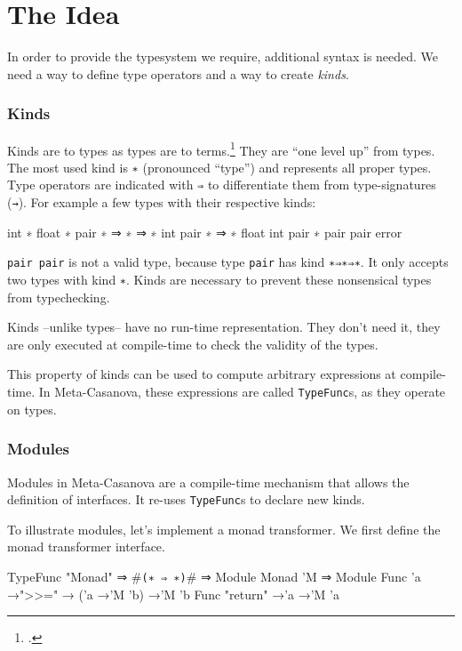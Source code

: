 \section{The Idea}
\begin{multicols}{2}\noindent
  In order to provide the typesystem we require, additional syntax is needed.
  We need a way to define type operators and a way to create \textit{kinds}.

  \subsubsection*{Kinds}
  Kinds are to types as types are to terms.\footcite[Chapter~30]{Pierce02}
  They are ``one level up'' from types.
  The most used kind is \texttt{∗} (pronounced ``type'') and represents all proper types.
  Type operators are indicated with \texttt{⇒} to differentiate them from type-signatures (\texttt{→}).
  For example a few types with their respective kinds:
  \begin{code}
  int             ∗
  float           ∗
  pair            ∗ ⇒ ∗ ⇒ ∗
  int pair        ∗ ⇒ ∗ 
  float int pair  ∗
  pair pair       error
  \end{code}

  \texttt{pair pair} is not a valid type, because type \texttt{pair} has kind \texttt{∗⇒∗⇒∗}.
  It only accepts two types with kind \texttt{∗}.
  Kinds are necessary to prevent these nonsensical types from typechecking.

  Kinds --unlike types-- have no run-time representation.
  They don't need it, they are only executed at compile-time to check the validity of the types.

  This property of kinds can be used to compute arbitrary expressions at compile-time.
  In Meta-Casanova, these expressions are called \texttt{TypeFunc}s, as they operate on types.

  \subsubsection*{Modules}
  Modules in Meta-Casanova are a compile-time mechanism that allows the definition of interfaces.
  It re-uses \texttt{TypeFunc}s to declare new kinds.

  To illustrate modules, let's implement a monad transformer.
  We first define the monad transformer interface.
  
  \begin{code}[caption=A generic monad transformer]
  TypeFunc "Monad" ⇒ #\verb|(∗ ⇒ ∗)|# ⇒ Module
  Monad 'M ⇒ Module {
    Func 'a →">>=" → ('a →'M 'b) →'M 'b
    Func "return" →'a →'M 'a
  }
  \end{code}


\end{multicols}
